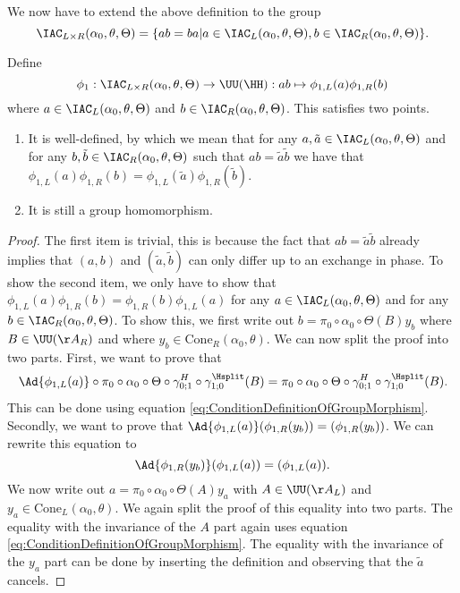 We now have to extend the above definition to the group
\begin{equation}
	\IAC_{L\times R}(\alpha_0,\theta,\Theta)=\{ab=ba|a\in\IAC_{L}(\alpha_0,\theta,\Theta),b\in\IAC_{R}(\alpha_0,\theta,\Theta)\}.
\end{equation}
\begin{lemma}\label{lem:extensionOfPhi1Definition}
	Define
	\begin{equation}
		\phi_1:\IAC_{L\times R}(\alpha_0,\theta,\Theta)\rightarrow\UU(\HH):ab\mapsto \phi_{1,L}(a)\phi_{1,R}(b)
	\end{equation}
	where $a\in \IAC_{L}(\alpha_0,\theta,\Theta)$ and $b\in \IAC_{R}(\alpha_0,\theta,\Theta)$. This satisfies two points.
	\begin{enumerate}
		\item It is well-defined, by which we mean that for any $a,\tilde{a}\in \IAC_{L}(\alpha_0,\theta,\Theta)$ and for any $b,\tilde{b}\in \IAC_{R}(\alpha_0,\theta,\Theta)$ such that $ab=\tilde{a}\tilde{b}$ we have that $\phi_{1,L}(a)\phi_{1,R}(b)=\phi_{1,L}(\tilde a)\phi_{1,R}(\tilde b)$.
		\item It is still a group homomorphism.
	\end{enumerate}
\end{lemma}
\begin{proof}
	The first item is trivial, this is because the fact that $ab=\tilde{a}\tilde{b}$ already implies that $(a,b)$ and $(\tilde{a},\tilde{b})$ can only differ up to an exchange in phase. To show the second item, we only have to show that $\phi_{1,L}(a)\phi_{1,R}(b)=\phi_{1,R}(b)\phi_{1,L}(a)$ for any $a\in \IAC_{L}(\alpha_0,\theta,\Theta)$ and for any $b\in \IAC_{R}(\alpha_0,\theta,\Theta)$. To show this, we first write out $b=\pi_0\circ\alpha_0\circ\Theta(B)y_b$ where $B\in\UU(\AA_R)$ and where $y_b\in\textrm{Cone}_R(\alpha_0,\theta)$. We can now split the proof into two parts. First, we want to prove that
	\begin{equation}
		\Ad{\phi_{1,L}(a)}\circ\pi_0\circ\alpha_0\circ\Theta\circ\gamma_{0;1}^H\circ\gamma^\Hsplit_{1;0}(B)=\pi_0\circ\alpha_0\circ\Theta\circ\gamma_{0;1}^H\circ\gamma^\Hsplit_{1;0}(B).
	\end{equation}
	This can be done using equation \eqref{eq:ConditionDefinitionOfGroupMorphism}. Secondly, we want to prove that $\Ad{\phi_{1,L}(a)}(\phi_{1,R}(y_b))=(\phi_{1,R}(y_b))$. We can rewrite this equation to
	\begin{equation}
		\Ad{\phi_{1,R}(y_b)}(\phi_{1,L}(a))=(\phi_{1,L}(a)).
	\end{equation}
	We now write out $a=\pi_0\circ\alpha_0\circ\Theta(A)y_a$ with $A\in\UU(\AA_L)$ and $y_a\in\textrm{Cone}_L(\alpha_0,\theta)$. We again split the proof of this equality into two parts. The equality with the invariance of the $A$ part again uses equation \eqref{eq:ConditionDefinitionOfGroupMorphism}. The equality with the invariance of the $y_a$ part can be done by inserting the definition and observing that the $\tilde{a}$ cancels.
\end{proof}
